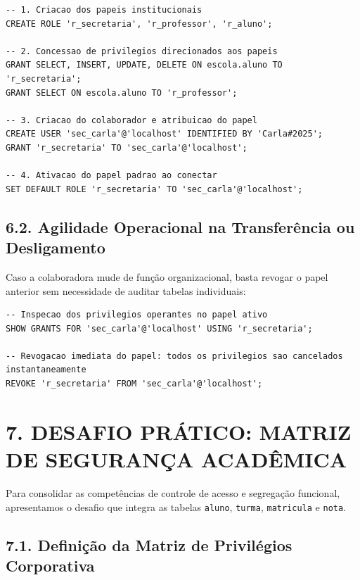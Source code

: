 \begin{lstlisting}
-- 1. Criacao dos papeis institucionais
CREATE ROLE 'r_secretaria', 'r_professor', 'r_aluno';

-- 2. Concessao de privilegios direcionados aos papeis
GRANT SELECT, INSERT, UPDATE, DELETE ON escola.aluno TO 'r_secretaria';
GRANT SELECT ON escola.aluno TO 'r_professor';

-- 3. Criacao do colaborador e atribuicao do papel
CREATE USER 'sec_carla'@'localhost' IDENTIFIED BY 'Carla#2025';
GRANT 'r_secretaria' TO 'sec_carla'@'localhost';

-- 4. Ativacao do papel padrao ao conectar
SET DEFAULT ROLE 'r_secretaria' TO 'sec_carla'@'localhost';
\end{lstlisting}

\subsection*{6.2. Agilidade Operacional na Transferência ou Desligamento}

Caso a colaboradora mude de função organizacional, basta revogar o papel anterior sem necessidade de auditar tabelas individuais:

\begin{lstlisting}
-- Inspecao dos privilegios operantes no papel ativo
SHOW GRANTS FOR 'sec_carla'@'localhost' USING 'r_secretaria';

-- Revogacao imediata do papel: todos os privilegios sao cancelados instantaneamente
REVOKE 'r_secretaria' FROM 'sec_carla'@'localhost';
\end{lstlisting}

\newpage

\section*{7. DESAFIO PRÁTICO: MATRIZ DE SEGURANÇA ACADÊMICA}

Para consolidar as competências de controle de acesso e segregação funcional, apresentamos o desafio que integra as tabelas \texttt{aluno}, \texttt{turma}, \texttt{matricula} e \texttt{nota}.

\subsection*{7.1. Definição da Matriz de Privilégios Corporativa}

